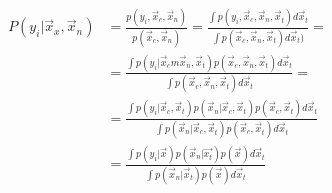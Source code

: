 	\begin{align*}
		P(y_i|\vec{x}_x, \vec{x}_n) &=\frac{p(y_i, \vec{x}_c, \vec{x}_n)}{p(\vec{x}_c, \vec{x}_n)} = \frac{\int p(y_i, \vec{x}_c, \vec{x}_n, \vec{x}_t)d\vec{x}_t}{\int p(\vec{x}_c, \vec{x}_n, \vec{x}_t)d\vec{x}_t)}=\\
																&=\frac{\int p(y_i|\vec{x}_cm \vec{x}_n, \vec{x}_t)p(\vec{x}_c, \vec{x}_n, \vec{x}_t)d\vec{x}_t}{\int p(\vec{x}_c, \vec{x}_n, \vec{x}_t)d\vec{x}_t}=\\
																&=\frac{\int p(y_i|\vec{x}_c, \vec{x}_t)p(\vec{x}_n|\vec{x}_c, \vec{x}_t)p(\vec{x}_c, \vec{x}_t)d\vec{x}_t}{\int p(\vec{x}_n|\vec{x}_c, \vec{x}_t)p(\vec{x}_c, \vec{x}_t)d\vec{x}_t}\\
																&=\frac{\int p(y_i|\vec{x})p(\vec{x}_n|\vec{x_t})p(\vec{x})d\vec{x}_t}{\int p(\vec{x}_n|\vec{x}_t)p(\vec{x})d\vec{x}_t}
	\end{align*}

